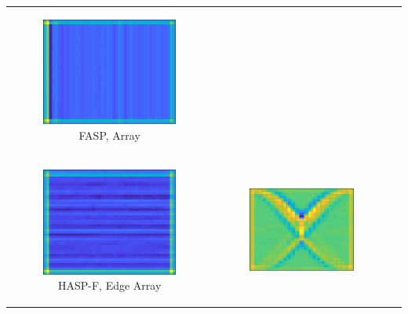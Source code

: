 {\begin{table}[tb]
\begin{tabular}{ccc}
		\begin{subfigure}{0.3\textwidth}\centering\includegraphics[width=0.8\columnwidth]{./dasp_algorithm_results/dasp_cnn_single_dream_fc_4.eps}
		\caption{FASP, Array}\label{fig:cnnfc4}
		\end{subfigure}    \\
		\begin{subfigure}{0.3\textwidth}\centering\includegraphics[width=0.8\columnwidth]{./dasp_algorithm_results/dasp_cnn_single_dream_fc_6.eps}
		\caption{HASP-F, Edge Array}\label{fig:cnnfc6}
		\end{subfigure}&
		\begin{subfigure}{0.3\textwidth}\centering\includegraphics[width=0.8\columnwidth]{./dasp_algorithm_results/dasp_cnn_single_dream_fc_7.eps}

\end{subfigure}
\end{tabular}
\end{table}}
